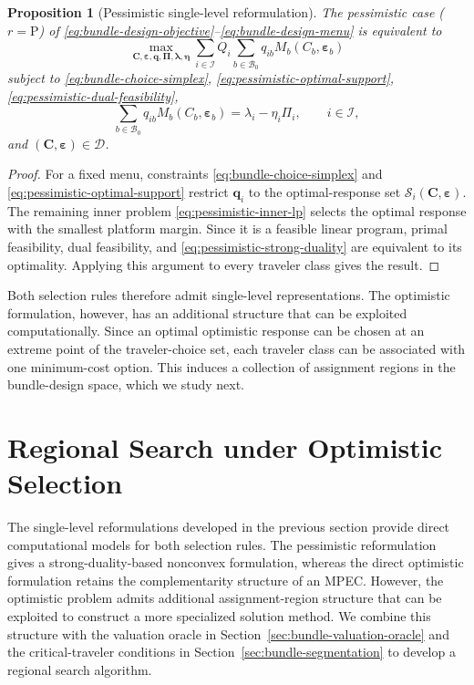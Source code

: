 \documentclass{article}
\newtheorem{proposition}{Proposition}
\begin{document}
\begin{proposition}[Pessimistic single-level reformulation]
The pessimistic case ($r=\mathrm P$) of
\eqref{eq:bundle-design-objective}--\eqref{eq:bundle-design-menu}
is equivalent to
\begin{equation}
    \max_{\bm C,\bm\varepsilon,\bm q,\bm\Pi,\bm\lambda,\bm\eta}
    \sum_{i\in\mathcal I}
    Q_i
    \sum_{b\in\mathcal B_0}
    q_{ib}M_b(C_b,\bm\varepsilon_b)
    \label{eq:pessimistic-single-level-objective}
\end{equation}
subject to
\eqref{eq:bundle-choice-simplex},
\eqref{eq:pessimistic-optimal-support},
\eqref{eq:pessimistic-dual-feasibility},
\begin{equation}
    \sum_{b\in\mathcal B_0}
    q_{ib}M_b(C_b,\bm\varepsilon_b)
    =
    \lambda_i-\eta_i\Pi_i,
    \qquad
    i\in\mathcal I,
    \label{eq:pessimistic-strong-duality}
\end{equation}
and $(\bm C,\bm\varepsilon)\in\mathcal D$.
\label{prop:pessimistic-single-level}
\end{proposition}

\begin{proof}
For a fixed menu, constraints
\eqref{eq:bundle-choice-simplex} and
\eqref{eq:pessimistic-optimal-support}
restrict $\bm q_i$ to the optimal-response set
$\mathcal S_i(\bm C,\bm\varepsilon)$. The remaining inner problem
\eqref{eq:pessimistic-inner-lp} selects the optimal response with the
smallest platform margin. Since it is a feasible linear program, primal
feasibility, dual feasibility, and
\eqref{eq:pessimistic-strong-duality} are equivalent to its optimality.
Applying this argument to every traveler class gives the result.
\end{proof}

Both selection rules therefore admit single-level representations.
The optimistic formulation, however, has an additional structure that
can be exploited computationally. Since an optimal optimistic response
can be chosen at an extreme point of the traveler-choice set, each
traveler class can be associated with one minimum-cost option. This
induces a collection of assignment regions in the bundle-design space,
which we study next.

\section{Regional Search under Optimistic Selection}
\label{sec:regional-search}

The single-level reformulations developed in the previous section provide
direct computational models for both selection rules. The pessimistic
reformulation gives a strong-duality-based nonconvex formulation, whereas
the direct optimistic formulation retains the complementarity structure
of an MPEC. However, the optimistic problem admits additional
assignment-region structure that can be exploited to construct a more
specialized solution method. We combine this structure with the valuation
oracle in Section~\ref{sec:bundle-valuation-oracle} and the critical-traveler
conditions in Section~\ref{sec:bundle-segmentation} to develop a regional
search algorithm.
\end{document}

